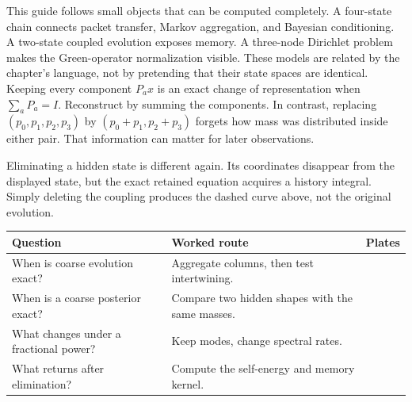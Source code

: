 This guide follows small objects that can be computed completely. A four-state chain connects packet transfer, Markov aggregation, and Bayesian conditioning. A two-state coupled evolution exposes memory. A three-node Dirichlet problem makes the Green-operator normalization visible. These models are related by the chapter's language, not by pretending that their state spaces are identical.
Keeping every component $P_a x$ is an exact change of representation when $\sum_aP_a=I$. Reconstruct by summing the components. In contrast, replacing $(p_0,p_1,p_2,p_3)$ by $(p_0+p_1,p_2+p_3)$ forgets how mass was distributed inside either pair. That information can matter for later observations.

Eliminating a hidden state is different again. Its coordinates disappear from the displayed state, but the exact retained equation acquires a history integral. Simply deleting the coupling produces the dashed curve above, not the original evolution.
\begin{center}\small
\begin{tabularx}{\linewidth}{@{}lYl@{}}\toprule
Question & Worked route & Plates\\\midrule
When is coarse evolution exact? & Aggregate columns, then test intertwining. & \\
When is a coarse posterior exact? & Compare two hidden shapes with the same masses. & \\
What changes under a fractional power? & Keep modes, change spectral rates. & \\
What returns after elimination? & Compute the self-energy and memory kernel. & \\\bottomrule
\end{tabularx}\end{center}


